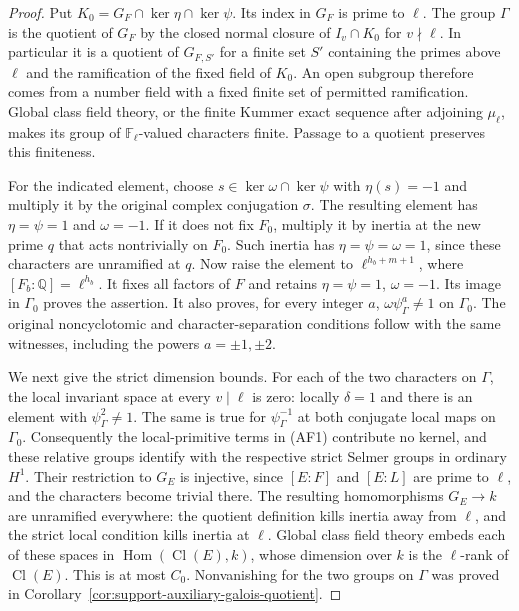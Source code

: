\begin{proof}
Put $K_0=G_F\cap\ker\eta\cap\ker\psi$.
Its index in $G_F$ is prime to $\ell$.  The group $\Gamma$
is the quotient of $G_F$ by the closed normal closure of
$I_v\cap K_0$ for $v\nmid\ell$.  In particular it is a
quotient of $G_{F,S'}$ for a finite set $S'$ containing the
primes above $\ell$ and the ramification of the fixed field
of $K_0$.  An open subgroup therefore comes from a number
field with a fixed finite set of permitted ramification.
Global class field theory, or the finite Kummer exact
sequence after adjoining $\mu_\ell$, makes its group of
$\mathbb F_\ell$-valued characters finite.  Passage to a
quotient preserves this finiteness.

For the indicated element, choose
$s\in\ker\omega\cap\ker\psi$ with $\eta(s)=-1$ and
multiply it by the original complex conjugation $\sigma$.
The resulting element has $\eta=\psi=1$ and $\omega=-1$.
If it does not fix $F_0$, multiply it by inertia at the
new prime $q$ that acts nontrivially on $F_0$.  Such inertia
has $\eta=\psi=\omega=1$, since these characters are
unramified at $q$.  Now raise the element to
$\ell^{h_b+m+1}$, where $[F_b:\mathbb Q]=\ell^{h_b}$.
It fixes all factors of $F$ and retains $\eta=\psi=1$,
$\omega=-1$.  Its image in $\Gamma_0$ proves the assertion.
It also proves, for every integer $a$,
$\omega\psi_\Gamma^a\ne1$ on $\Gamma_0$.  The original
noncyclotomic and character-separation conditions follow
with the same witnesses, including the powers $a=\pm1,\pm2$.

We next give the strict dimension bounds.  For each of the
two characters on $\Gamma$, the local invariant space at
every $v\mid\ell$ is zero: locally $\delta=1$ and there
is an element with $\psi_\Gamma^2\ne1$.  The same is true
for $\psi_\Gamma^{-1}$ at both conjugate local maps on
$\Gamma_0$.  Consequently the local-primitive terms in
(AF1) contribute no kernel, and these relative groups
identify with the respective strict Selmer groups in
ordinary $H^1$.  Their restriction to $G_E$ is injective,
since $[E:F]$ and $[E:L]$ are prime to $\ell$, and the
characters become trivial there.  The resulting
homomorphisms $G_E\to k$ are unramified everywhere: the
quotient definition kills inertia away from $\ell$, and
the strict local condition kills inertia at $\ell$.
Global class field theory embeds each of these spaces in
$\operatorname{Hom}(\operatorname{Cl}(E),k)$, whose
dimension over $k$ is the $\ell$-rank of
$\operatorname{Cl}(E)$.  This is at most $C_0$.
Nonvanishing for the two groups on $\Gamma$ was proved
in Corollary~\ref{cor:support-auxiliary-galois-quotient}.


\end{proof}
